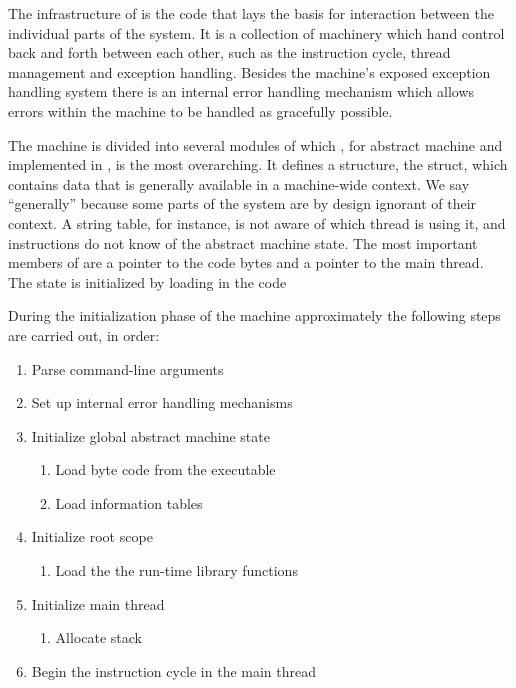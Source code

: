 

The infrastructure of \thename{} is the code that lays the basis for interaction
between the individual parts of the system. It is a collection of machinery
which hand control back and forth between each other, such as the instruction
cycle, thread management and exception handling. Besides the machine's exposed
exception handling system there is an internal error handling mechanism which
allows errors within the machine to be handled as gracefully possible.

The machine is divided into several modules of which , for abstract
machine and implemented in , is the most overarching. It defines a
structure, the  struct, which contains data that is generally
available in a machine-wide context. We say ``generally'' because some parts of
the system are by design ignorant of their context. A string table, for
instance, is not aware of which thread is using it, and instructions do not know
of the abstract machine state. The most important members of 
are a pointer to the code bytes and a pointer to the main thread. The state is
initialized by loading in the code %

During the initialization phase of the machine approximately the following steps
are carried out, in order: %

\begin{enumerate}
\item Parse command-line arguments
\item Set up internal error handling mechanisms
\item Initialize global abstract machine state
  \begin{enumerate}
  \item Load byte code from the executable
  \item Load information tables %
  \end{enumerate}
\item Initialize root scope
  \begin{enumerate}
  \item Load the the run-time library functions
  \end{enumerate}
\item Initialize main thread
  \begin{enumerate}
  \item Allocate stack
  \end{enumerate}
\item Begin the instruction cycle in the main thread
\end{enumerate}

